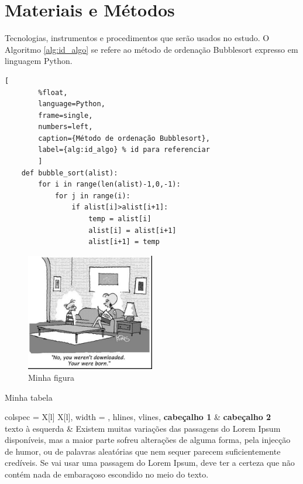 \documentclass[12pt]{article}
\begin{document}
\section{Materiais e Métodos}
    Tecnologias, instrumentos e procedimentos que serão usados no estudo. O Algoritmo \ref{alg:id_algo} se refere ao método de ordenação Bubblesort expresso em linguagem Python.

    \begin{lstlisting}[  
        %float,
        language=Python, 
        frame=single, 
        numbers=left,
        caption={Método de ordenação Bubblesort},
        label={alg:id_algo} % id para referenciar
        ]        
    def bubble_sort(alist):
        for i in range(len(alist)-1,0,-1):
            for j in range(i):
                if alist[i]>alist[i+1]:
                    temp = alist[i]
                    alist[i] = alist[i+1]
                    alist[i+1] = temp    
    \end{lstlisting}

    \begin{figure}[H]
        \centering
        \includegraphics[width=0.5\textwidth]{fig1.jpg}
        \caption{Minha figura}
        \label{fig:id_figura}
    \end{figure}
    
     \begin{table}[ht]
        \centering
        \caption{Minha tabela}
        \label{tab:id_tabela}
        \begin{tblr}{
          colspec = {X[l] X[l]}, %
          width = \linewidth,
          hlines, %
          vlines, %
        }
        \textbf{cabeçalho 1} & \textbf{cabeçalho 2} \\
        {texto à esquerda} & {Existem muitas variações das passagens do Lorem Ipsum disponíveis, mas a maior parte sofreu alterações de alguma forma, pela injecção de humor, ou de palavras aleatórias que nem sequer parecem suficientemente credíveis. Se vai usar uma passagem do Lorem Ipsum, deve ter a certeza que não contém nada de embaraçoso escondido no meio do texto.}
        \end{tblr}
    \end{table}
\end{document}
